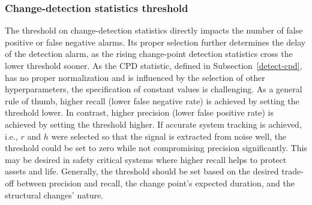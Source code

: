 \subsubsection{Change-detection statistics threshold}
The threshold on change-detection statistics directly impacts the number of false positive or false negative alarms. Its proper selection further determines the delay of the detection alarm, as the rising change-point detection statistics cross the lower threshold sooner. As the CPD statistic, defined in Subsection~\ref{detect-cpd}, has no proper normalization and is influenced by the selection of other hyperparameters, the specification of constant values is challenging. As a general rule of thumb, higher recall (lower false negative rate) is achieved by setting the threshold lower. In contrast, higher precision (lower false positive rate) is achieved by setting the threshold higher. If accurate system tracking is achieved, i.e., \( r \) and \(h\) were selected so that the signal is extracted from noise well, the threshold could be set to zero while not compromising precision significantly. This may be desired in safety critical systems where higher recall helps to protect assets and life. Generally, the threshold should be set based on the desired trade-off between precision and recall, the change point's expected duration, and the structural changes' nature.
